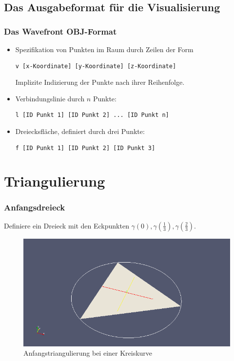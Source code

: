 \documentclass{beamer}
\begin{document}
\subsection{Das Ausgabeformat für die Visualisierung}

\begin{frame}[fragile]
	\frametitle{Das Wavefront OBJ-Format}
	\begin{itemize}
		\item
			Spezifikation von Punkten im Raum durch Zeilen der Form
			\begin{verbatim}
v [x-Koordinate] [y-Koordinate] [z-Koordinate]
			\end{verbatim}
			Implizite Indizierung der Punkte nach ihrer Reihenfolge.
		\item
			Verbindungslinie durch $n$ Punkte:
			\begin{verbatim}
l [ID Punkt 1] [ID Punkt 2] ... [ID Punkt n]
			\end{verbatim}
		\item
			Dreiecksfläche, definiert durch drei Punkte:
			\begin{verbatim}
f [ID Punkt 1] [ID Punkt 2] [ID Punkt 3]
			\end{verbatim}
	\end{itemize}
\end{frame}



\section{Triangulierung}

\begin{frame}
	\frametitle{Anfangsdreieck}

	Definiere ein Dreieck mit den Eckpunkten $\gamma(0), \gamma(\frac 13), \gamma(\frac 23)$.
	\begin{figure}
		\caption{Anfangstriangulierung bei einer Kreiskurve}
		\includegraphics[width=0.8 \linewidth]{kreis0.png}
	\end{figure}
\end{frame}
\end{document}
